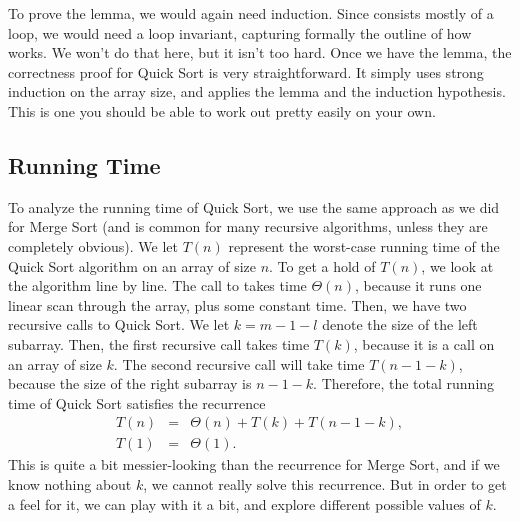 To prove the lemma, we would again need induction.
Since  consists mostly of a loop, we would need a loop
invariant, capturing formally the outline of how 
works. We won't do that here, but it isn't too hard.
Once we have the lemma, the correctness proof for Quick Sort is very
straightforward. It simply uses strong induction on the array size,
and applies the lemma and the induction hypothesis. This is one you
should be able to work out pretty easily on your own.

\subsection{Running Time}
To analyze the running time of Quick Sort, we use the same approach as
we did for Merge Sort (and is common for many recursive algorithms,
unless they are completely obvious).
We let $T(n)$ represent the worst-case running time of the Quick Sort
algorithm on an array of size $n$. 
To get a hold of $T(n)$, we look at the algorithm line by line.  
The call to  takes time $\Theta(n)$, because it runs
one linear scan through the array, plus some constant time. 
Then, we have two recursive calls to Quick Sort.
We let $k = m-1-l$ denote the size of the left subarray.
Then, the first recursive call takes time $T(k)$, because it is a
call on an array of size $k$. 
The second recursive call will take time $T(n-1-k)$, because the size
of the right subarray is $n-1-k$. 
Therefore, the total running time of Quick Sort satisfies the
recurrence
\begin{eqnarray*}
T(n) & = & \Theta(n) + T(k) + T(n-1-k),\\
T(1)  & = & \Theta(1).
\end{eqnarray*}
This is quite a bit messier-looking than the recurrence for Merge
Sort, and if we know nothing about $k$, we cannot really solve this
recurrence. But in order to get a feel for it, we can play with it
a bit, and explore different possible values of $k$.

